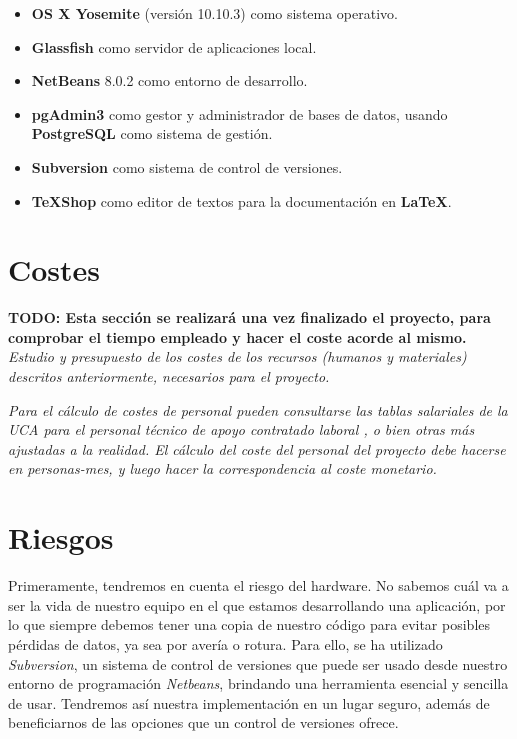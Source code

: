 \begin{itemize}
\item \textbf{OS X Yosemite} (versión 10.10.3) como sistema operativo.
\item \textbf{Glassfish} como servidor de aplicaciones local.
\item \textbf{NetBeans} 8.0.2 como entorno de desarrollo.
\item \textbf{pgAdmin3} como gestor y administrador de bases de datos, usando \textbf{PostgreSQL} como sistema de gestión.
\item \textbf{Subversion} como sistema de control de versiones.
\item \textbf{TeXShop} como editor de textos para la documentación en \textbf{LaTeX}.
\end{itemize}


\section{Costes}

\textbf{TODO: Esta sección se realizará una vez finalizado el proyecto, para comprobar el tiempo empleado y hacer el coste acorde al mismo.}
\\

\textit{Estudio y presupuesto de los costes de los recursos (humanos y materiales) descritos anteriormente, necesarios para el proyecto.}

\textit{Para el cálculo de costes de personal pueden consultarse las tablas salariales de la UCA para el personal técnico de apoyo contratado laboral \cite{paslaboral}, o bien otras más ajustadas a la realidad. El cálculo del coste del personal del proyecto debe hacerse en personas-mes, y luego hacer la correspondencia al coste monetario.}


\section{Riesgos}

Primeramente, tendremos en cuenta el riesgo del hardware. No sabemos cuál va a ser la vida de nuestro equipo en el que estamos desarrollando una aplicación, por lo que siempre debemos tener una copia de nuestro código para evitar posibles pérdidas de datos, ya sea por avería o rotura. Para ello, se ha utilizado \textit{Subversion}, un sistema de control de versiones que puede ser usado desde nuestro entorno de programación \textit{Netbeans}, brindando una herramienta esencial y sencilla de usar. Tendremos así nuestra implementación en un lugar seguro, además de beneficiarnos de las opciones que un control de versiones ofrece.
\\

